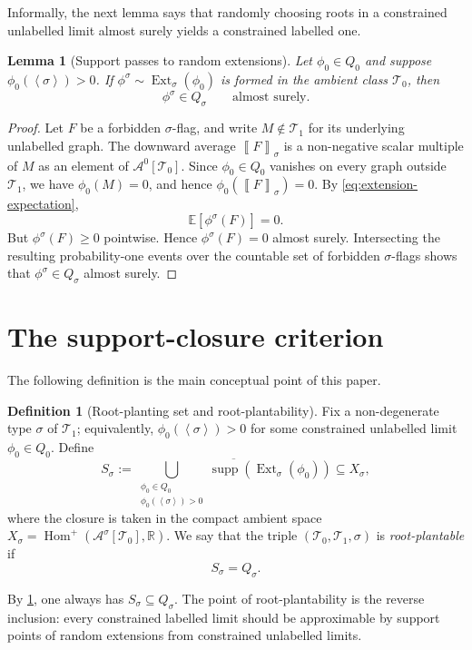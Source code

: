 \documentclass[11pt]{article}
\newtheorem{lemma}[lemma]{Lemma}
\theoremstyle{definition}
\newtheorem{definition}[definition]{Definition}
\newcommand{\R}{\mathbb{R}}
\newcommand{\E}{\mathbb{E}}
\newcommand{\A}{\mathcal{A}}
\newcommand{\T}{\mathcal{T}}
\newcommand{\Homp}{\operatorname{Hom}^{+}}
\newcommand{\Ext}{\operatorname{Ext}}
\newcommand{\supp}{\operatorname{supp}}
\newcommand{\brak}[1]{\left\langle #1\right\rangle}
\newcommand{\avg}[2]{\left\llbracket #1 \right\rrbracket_{#2}}
\begin{document}
Informally, the next lemma says that randomly choosing roots in a constrained unlabelled limit
almost surely yields a constrained labelled one.

\begin{lemma}[Support passes to random extensions]\label{lem:support-passes-general}
Let $\phi_0\in Q_0$ and suppose $\phi_0(\brak\sigma)>0$.  If
$\phi^\sigma\sim\Ext_\sigma(\phi_0)$ is formed in the ambient class $\T_0$,
then
\[
  \phi^\sigma\in Q_\sigma
  \qquad\text{almost surely.}
\]
\end{lemma}

\begin{proof}
Let $F$ be a forbidden $\sigma$-flag, and write $M\notin\T_1$ for its underlying unlabelled
graph.  The downward average $\avg{F}{\sigma}$ is a non-negative scalar multiple of $M$ as
an element of $\A^0[\T_0]$.  Since $\phi_0\in Q_0$ vanishes on every graph outside $\T_1$,
we have $\phi_0(M)=0$, and hence $\phi_0(\avg{F}{\sigma})=0$.  By \eqref{eq:extension-expectation},
\[
  \E[\phi^\sigma(F)]=0.
\]
But $\phi^\sigma(F)\ge0$ pointwise.  Hence $\phi^\sigma(F)=0$ almost surely.
Intersecting the resulting probability-one events over the countable set of
forbidden $\sigma$-flags shows that $\phi^\sigma\in Q_\sigma$ almost surely.
\end{proof}

\section{The support-closure criterion}

The following definition is the main conceptual point of this paper.

\begin{definition}[Root-planting set and root-plantability]\label{def:root-planting}
Fix a non-degenerate type $\sigma$ of $\T_1$; equivalently,
$\phi_0(\brak\sigma)>0$ for some constrained unlabelled limit $\phi_0\in Q_0$.  Define
\[
  S_\sigma
  :=
  \overline{
  \bigcup_{\substack{\phi_0\in Q_0\\ \phi_0(\brak\sigma)>0}}
  \supp(\Ext_\sigma(\phi_0))}
  \subseteq X_\sigma,
\]
where the closure is taken in the compact ambient space
$X_\sigma=\Homp(\A^\sigma[\T_0],\R)$.
We say that the triple $(\T_0,\T_1,\sigma)$ is \emph{root-plantable} if
\[
  S_\sigma=Q_\sigma.
\]
\end{definition}

By \cref{lem:support-passes-general}, one always has $S_\sigma\subseteq Q_\sigma$.
The point of root-plantability is the reverse inclusion: every constrained
labelled limit should be approximable by support points of random extensions from
constrained unlabelled limits.
\end{document}
